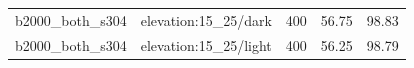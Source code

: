 \begin{longtable}{l>{\raggedright\arraybackslash}p{.42\linewidth}rrr}
b2000\_\allowbreak{}both\_\allowbreak{}s304 & %
elevation:15\_\allowbreak{}25/dark & %
400 & %
56.75 & %
98.83 \\ %

b2000\_\allowbreak{}both\_\allowbreak{}s304 & %
elevation:15\_\allowbreak{}25/light & %
400 & %
56.25 & %
98.79 \\ %


\end{longtable}
